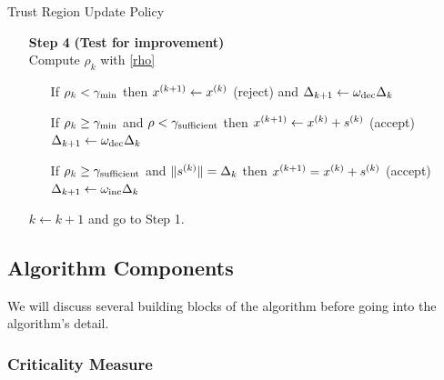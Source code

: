 \begin{algorithm}[H]
    \caption{Trust Region Update Policy}
    \label{trust_region_update}
    \begin{itemize}
        \item[\textbf{Step 4}] \textbf{(Test for improvement)} \\
            Compute $\rho_k$ with \cref{rho} \begin{itemize}
                \item[] If $\rho_k < \gamma_{\text{min}}$ then ${x}^{(k+1)} \gets {x}^{(k)}$ (reject) and $\Delta_{k+1} \gets \omega_{\text{dec}}\Delta_{k}$
                \item[] If $\rho_k \ge \gamma_{\text{min}}$ and $\rho < \gamma_{\text{sufficient}}$ then ${x}^{(k+1)}\gets{x}^{(k)}+{s}^{(k)}$ (accept) $\Delta_{k+1} \gets \omega_{\text{dec}}\Delta_{k}$
                \item[] If $\rho_k \ge \gamma_{\text{sufficient}}$ and $\|{s}^{(k)}\| = \Delta_{k}$ then ${x}^{(k+1)}={x}^{(k)}+{s}^{(k)}$ (accept) $\Delta_{k+1} \gets \omega_{\text{inc}}\Delta_{k}$
            \end{itemize}
            $k \gets k+1$ and go to Step 1.
    \end{itemize}
\end{algorithm}




\subsection{Algorithm Components}




We will discuss several building blocks of the algorithm before going into the algorithm's detail.


\subsubsection{Criticality Measure}

